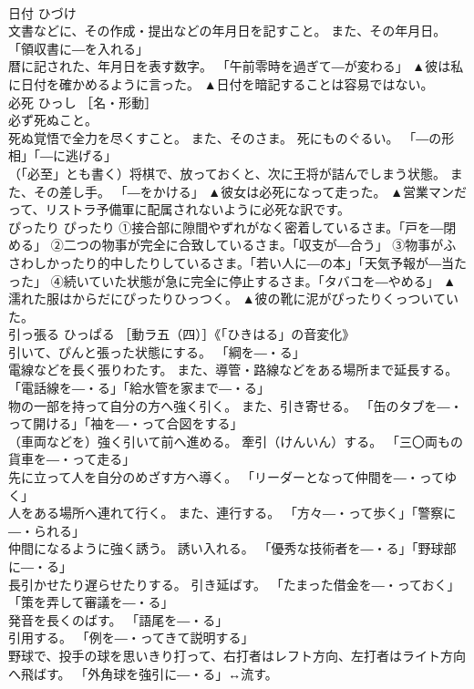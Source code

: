 \documentclass[8pt]{extreport}
\begin{document}
\begin{CJK}{UTF8}{min}
\\	日付	ひづけ	
\\	文書などに、その作成・提出などの年月日を記すこと。 また、その年月日。 「領収書に―を入れる」 
\\	暦に記された、年月日を表す数字。 「午前零時を過ぎて―が変わる」	▲彼は私に日付を確かめるように言った。 ▲日付を暗記することは容易ではない。
\\	必死	ひっし	［名・形動］ 
\\	必ず死ぬこと。 
\\	死ぬ覚悟で全力を尽くすこと。 また、そのさま。 死にものぐるい。 「―の形相」「―に逃げる」 
\\	（「必至」とも書く）将棋で、放っておくと、次に王将が詰んでしまう状態。 また、その差し手。 「―をかける」	▲彼女は必死になって走った。 ▲営業マンだって、リストラ予備軍に配属されないように必死な訳です。
\\	ぴったり	ぴったり	①接合部に隙間やずれがなく密着しているさま。「戸を―閉める」 ②二つの物事が完全に合致しているさま。「収支が―合う」 ③物事がふさわしかったり的中したりしているさま。「若い人に―の本」「天気予報が―当たった」 ④続いていた状態が急に完全に停止するさま。「タバコを―やめる」	▲濡れた服はからだにぴったりひっつく。 ▲彼の靴に泥がぴったりくっついていた。
\\	引っ張る	ひっぱる	［動ラ五（四）］《「ひきはる」の音変化》 
\\	引いて、ぴんと張った状態にする。 「綱を―・る」 
\\	電線などを長く張りわたす。 また、導管・路線などをある場所まで延長する。 「電話線を―・る」「給水管を家まで―・る」 
\\	物の一部を持って自分の方へ強く引く。 また、引き寄せる。 「缶のタブを―・って開ける」「袖を―・って合図をする」 
\\	（車両などを）強く引いて前へ進める。 牽引（けんいん）する。 「三〇両もの貨車を―・って走る」 
\\	先に立って人を自分のめざす方へ導く。 「リーダーとなって仲間を―・ってゆく」 
\\	人をある場所へ連れて行く。 また、連行する。 「方々―・って歩く」「警察に―・られる」 
\\	仲間になるように強く誘う。 誘い入れる。 「優秀な技術者を―・る」「野球部に―・る」 
\\	長引かせたり遅らせたりする。 引き延ばす。 「たまった借金を―・っておく」「策を弄して審議を―・る」 
\\	発音を長くのばす。 「語尾を―・る」 
\\	引用する。 「例を―・ってきて説明する」 
\\	野球で、投手の球を思いきり打って、右打者はレフト方向、左打者はライト方向へ飛ばす。 「外角球を強引に―・る」↔流す。 

\end{CJK}
\end{document}
